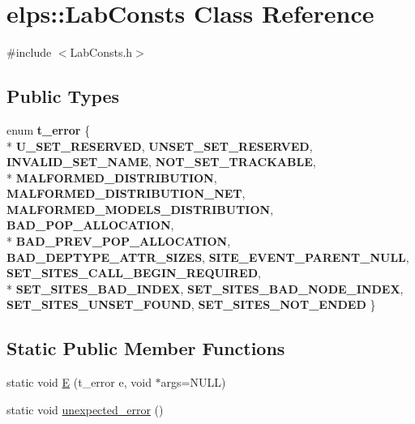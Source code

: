 \hypertarget{classelps_1_1_lab_consts}{\section{elps\-:\-:Lab\-Consts Class Reference}
\label{classelps_1_1_lab_consts}
}


{\ttfamily \#include $<$Lab\-Consts.\-h$>$}

\subsection*{Public Types}
\begin{DoxyCompactItemize}
\item 
enum {\bfseries t\-\_\-error} \{ \\*
{\bfseries U\-\_\-\-S\-E\-T\-\_\-\-R\-E\-S\-E\-R\-V\-E\-D}, 
{\bfseries U\-N\-S\-E\-T\-\_\-\-S\-E\-T\-\_\-\-R\-E\-S\-E\-R\-V\-E\-D}, 
{\bfseries I\-N\-V\-A\-L\-I\-D\-\_\-\-S\-E\-T\-\_\-\-N\-A\-M\-E}, 
{\bfseries N\-O\-T\-\_\-\-S\-E\-T\-\_\-\-T\-R\-A\-C\-K\-A\-B\-L\-E}, 
\\*
{\bfseries M\-A\-L\-F\-O\-R\-M\-E\-D\-\_\-\-D\-I\-S\-T\-R\-I\-B\-U\-T\-I\-O\-N}, 
{\bfseries M\-A\-L\-F\-O\-R\-M\-E\-D\-\_\-\-D\-I\-S\-T\-R\-I\-B\-U\-T\-I\-O\-N\-\_\-\-N\-E\-T}, 
{\bfseries M\-A\-L\-F\-O\-R\-M\-E\-D\-\_\-\-M\-O\-D\-E\-L\-S\-\_\-\-D\-I\-S\-T\-R\-I\-B\-U\-T\-I\-O\-N}, 
{\bfseries B\-A\-D\-\_\-\-P\-O\-P\-\_\-\-A\-L\-L\-O\-C\-A\-T\-I\-O\-N}, 
\\*
{\bfseries B\-A\-D\-\_\-\-P\-R\-E\-V\-\_\-\-P\-O\-P\-\_\-\-A\-L\-L\-O\-C\-A\-T\-I\-O\-N}, 
{\bfseries B\-A\-D\-\_\-\-D\-E\-P\-T\-Y\-P\-E\-\_\-\-A\-T\-T\-R\-\_\-\-S\-I\-Z\-E\-S}, 
{\bfseries S\-I\-T\-E\-\_\-\-E\-V\-E\-N\-T\-\_\-\-P\-A\-R\-E\-N\-T\-\_\-\-N\-U\-L\-L}, 
{\bfseries S\-E\-T\-\_\-\-S\-I\-T\-E\-S\-\_\-\-C\-A\-L\-L\-\_\-\-B\-E\-G\-I\-N\-\_\-\-R\-E\-Q\-U\-I\-R\-E\-D}, 
\\*
{\bfseries S\-E\-T\-\_\-\-S\-I\-T\-E\-S\-\_\-\-B\-A\-D\-\_\-\-I\-N\-D\-E\-X}, 
{\bfseries S\-E\-T\-\_\-\-S\-I\-T\-E\-S\-\_\-\-B\-A\-D\-\_\-\-N\-O\-D\-E\-\_\-\-I\-N\-D\-E\-X}, 
{\bfseries S\-E\-T\-\_\-\-S\-I\-T\-E\-S\-\_\-\-U\-N\-S\-E\-T\-\_\-\-F\-O\-U\-N\-D}, 
{\bfseries S\-E\-T\-\_\-\-S\-I\-T\-E\-S\-\_\-\-N\-O\-T\-\_\-\-E\-N\-D\-E\-D}
 \}
\end{DoxyCompactItemize}
\subsection*{Static Public Member Functions}
\begin{DoxyCompactItemize}
\item 
static void \hyperlink{classelps_1_1_lab_consts_a1a402f6065512ba3400151c870b4daca}{E} (t\-\_\-error e, void $\ast$args=N\-U\-L\-L)
\item 
static void \hyperlink{classelps_1_1_lab_consts_a766d810d7e33b099eec25a7e29c22e57}{unexpected\-\_\-error} ()
\end{DoxyCompactItemize}


